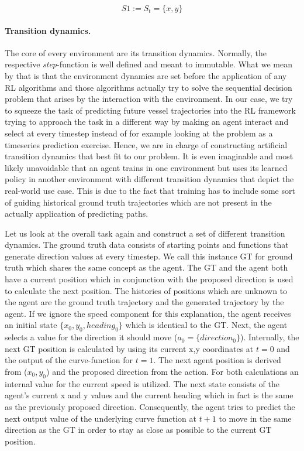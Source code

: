 \begin{equation}
    S1 := S_t = \{x,y\}
\end{equation}


\paragraph{Transition dynamics.} The core of every environment are its transition dynamics. Normally, the respective \textit{step}-function is well defined and meant to immutable. What we mean by that is that the environment dynamics are set before the application of any RL algorithms and those algorithms actually try to solve the sequential decision problem that arises by the interaction with the environment. In our case, we try to squeeze the task of predicting future vessel trajectories into the RL framework trying to approach the task in a different way by making an agent interact and select at every timestep instead of for example looking at the problem as a timeseries prediction exercise. Hence, we are in charge of constructing artificial transition dynamics that best fit to our problem. It is even imaginable and most likely unavoidable that an agent trains in one environment but uses its learned policy in another environment with different transition dynamics that depict the real-world use case. This is due to the fact that training has to include some sort of guiding historical ground truth trajectories which are not present in the actually application of predicting paths.
\par
Let us look at the overall task again and construct a set of different transition dynamics. The ground truth data consists of starting points and functions that generate direction values at every timestep. We call this instance GT for ground truth which shares the same concept as the agent. The GT and the agent both have a current position which in conjunction with the proposed direction is used to calculate the next position. The histories of positions which are unknown to the agent are the ground truth trajectory and the generated trajectory by the agent. If we ignore the speed component for this explanation, the agent receives an initial state $\{x_0,y_0,heading_0\}$ which is identical to the GT. Next, the agent selects a value for the direction it should move ($a_0=\{direction_0\}$). Internally, the next GT position is calculated by using its current x,y coordinates at $t=0$ and the output of the curve-function for $t=1$. The next agent position is derived from ($x_0, y_0$) and the proposed direction from the action. For both calculations an internal value for the current speed is utilized. The next state consists of the agent's current x and y values and the current heading which in fact is the same as the previously proposed direction. Consequently, the agent tries to predict the next output value of the underlying curve function at $t+1$ to move in the same direction as the GT in order to stay as close as possible to the current GT position.
